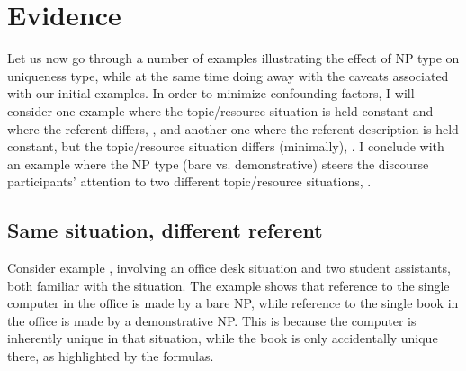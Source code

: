 \documentclass[output=paper,colorlinks,citecolor=brown,newtxmath]{langscibook}
\begin{document}
\section{Evidence}\label{simik:sec:evidence}

Let us now go through a number of examples illustrating the effect of NP type on uniqueness type, while at the same time doing away with the caveats associated with our initial examples. In order to minimize confounding factors, I will consider one example where the topic/resource situation is held constant and where the referent differs, , and another one where the referent description is held constant, but the topic/resource situation differs (minimally), . I conclude with an example where the NP type (bare vs. demonstrative) steers the discourse participants' attention to two different topic/resource situations, .

\subsection{Same situation, different referent}\label{simik:sec:same-sit}\largerpage

Consider example , involving an office desk situation and two student assistants, both familiar with the situation. The example shows that reference to the single computer in the office is made by a bare NP, while reference to the single book in the office is made by a demonstrative NP. This is because the computer is inherently unique in that situation, while the book is only accidentally unique there, as highlighted by the formulas.
\end{document}
